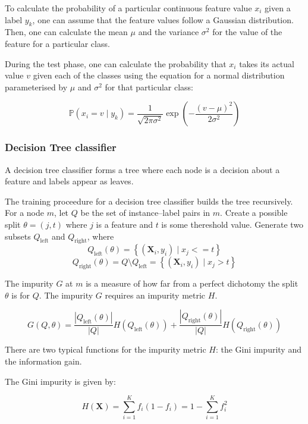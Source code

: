         To calculate the probability of a particular continuous feature value $x_i$ given a label $y_k$, one can assume that the feature values follow a Gaussian distribution. Then, one can calculate the mean $\mu$ and the variance $\sigma^2$ for the value of the feature for a particular class.
      
        During the test phase, one can calculate the probability that $x_i$ takes its actual value $v$ given each of the classes using the equation for a normal distribution parameterised by $\mu$ and $\sigma^2$ for that particular class:
      
        $$\mathbb{P}(x_i = v \mid y_k) = \frac{1}{\sqrt{2 \pi \sigma^2}} \exp \left(-\frac{(v - \mu)^2}{2 \sigma^2}\right)$$
        
      \subsubsection{Decision Tree classifier}
        A decision tree classifier forms a tree where each node is a decision about a feature and labels appear as leaves.
        
        The training proceedure for a decision tree classifier builds the tree recursively. For a node $m$, let $Q$ be the set of instance--label pairs in $m$. Create a possible split $\theta = (j, t)$ where $j$ is a feature and $t$ is some thereshold value. Generate two subsets $Q_\mathrm{left}$ and $Q_\mathrm{right}$, where 
        $$Q_\mathrm{left}(\theta) = \left\{ (\mathbf{X}_i,y_i) \mid x_j <= t \right \}$$
        $$Q_\mathrm{right}(\theta) = Q \setminus Q_\mathrm{left} = \left\{ (\mathbf{X}_i,y_i) \mid x_j > t \right \}$$
      
        The impurity $G$ at $m$ is a measure of how far from a perfect dichotomy the split $\theta$ is for $Q$. The impurity $G$ requires an impurity metric $H$.
      
        $$G(Q, \theta) = \frac{|Q_\mathrm{left}(\theta)|}{|Q|} H(Q_\mathrm{left}(\theta)) + \frac{|Q_\mathrm{right}(\theta)|}{|Q|} H(Q_\mathrm{right}(\theta))$$
        
        
        
        There are two typical functions for the impurity metric $H$: the Gini impurity and the information gain. 
        
        The Gini impurity is given by:
      
        $$H(\mathbf{X}) = \sum \limits_{i=1}^K f_i(1-f_i) = 1 - \sum \limits_{i=1}^K f_i^2$$
      

